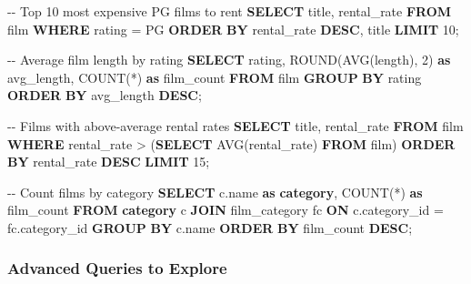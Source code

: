 \documentclass[
  letterpaper,
  DIV=11,
  numbers=noendperiod]{scrartcl}
\newenvironment{Shaded}{\begin{snugshade}}{\end{snugshade}}
\newcommand{\CommentTok}[1]{\textcolor[rgb]{0.37,0.37,0.37}{#1}}
\newcommand{\DecValTok}[1]{\textcolor[rgb]{0.68,0.00,0.00}{#1}}
\newcommand{\FunctionTok}[1]{\textcolor[rgb]{0.28,0.35,0.67}{#1}}
\newcommand{\KeywordTok}[1]{\textcolor[rgb]{0.00,0.23,0.31}{\textbf{#1}}}
\newcommand{\NormalTok}[1]{\textcolor[rgb]{0.00,0.23,0.31}{#1}}
\newcommand{\OperatorTok}[1]{\textcolor[rgb]{0.37,0.37,0.37}{#1}}
\newcommand{\StringTok}[1]{\textcolor[rgb]{0.13,0.47,0.30}{#1}}
\begin{document}
\begin{Shaded}
\begin{Highlighting}[]
\CommentTok{{-}{-} Top 10 most expensive PG films to rent}
\KeywordTok{SELECT}\NormalTok{ title, rental\_rate}
\KeywordTok{FROM}\NormalTok{ film}
\KeywordTok{WHERE}\NormalTok{ rating }\OperatorTok{=} \StringTok{\textquotesingle{}PG\textquotesingle{}}
\KeywordTok{ORDER} \KeywordTok{BY}\NormalTok{ rental\_rate }\KeywordTok{DESC}\NormalTok{, title}
\KeywordTok{LIMIT} \DecValTok{10}\NormalTok{;}

\CommentTok{{-}{-} Average film length by rating}
\KeywordTok{SELECT}\NormalTok{ rating, }
       \FunctionTok{ROUND}\NormalTok{(}\FunctionTok{AVG}\NormalTok{(}\FunctionTok{length}\NormalTok{), }\DecValTok{2}\NormalTok{) }\KeywordTok{as}\NormalTok{ avg\_length,}
       \FunctionTok{COUNT}\NormalTok{(}\OperatorTok{*}\NormalTok{) }\KeywordTok{as}\NormalTok{ film\_count}
\KeywordTok{FROM}\NormalTok{ film}
\KeywordTok{GROUP} \KeywordTok{BY}\NormalTok{ rating}
\KeywordTok{ORDER} \KeywordTok{BY}\NormalTok{ avg\_length }\KeywordTok{DESC}\NormalTok{;}

\CommentTok{{-}{-} Films with above{-}average rental rates}
\KeywordTok{SELECT}\NormalTok{ title, rental\_rate}
\KeywordTok{FROM}\NormalTok{ film}
\KeywordTok{WHERE}\NormalTok{ rental\_rate }\OperatorTok{\textgreater{}}\NormalTok{ (}\KeywordTok{SELECT} \FunctionTok{AVG}\NormalTok{(rental\_rate) }\KeywordTok{FROM}\NormalTok{ film)}
\KeywordTok{ORDER} \KeywordTok{BY}\NormalTok{ rental\_rate }\KeywordTok{DESC}
\KeywordTok{LIMIT} \DecValTok{15}\NormalTok{;}

\CommentTok{{-}{-} Count films by category}
\KeywordTok{SELECT}\NormalTok{ c.name }\KeywordTok{as} \KeywordTok{category}\NormalTok{, }\FunctionTok{COUNT}\NormalTok{(}\OperatorTok{*}\NormalTok{) }\KeywordTok{as}\NormalTok{ film\_count}
\KeywordTok{FROM} \KeywordTok{category}\NormalTok{ c}
\KeywordTok{JOIN}\NormalTok{ film\_category fc }\KeywordTok{ON}\NormalTok{ c.category\_id }\OperatorTok{=}\NormalTok{ fc.category\_id}
\KeywordTok{GROUP} \KeywordTok{BY}\NormalTok{ c.name}
\KeywordTok{ORDER} \KeywordTok{BY}\NormalTok{ film\_count }\KeywordTok{DESC}\NormalTok{;}
\end{Highlighting}
\end{Shaded}

\subsubsection{Advanced Queries to
Explore}\label{advanced-queries-to-explore}
\end{document}
